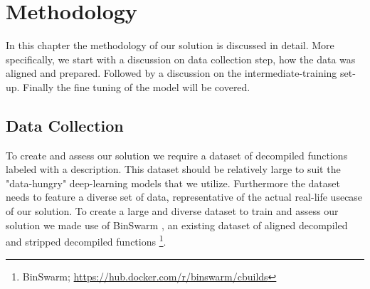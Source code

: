 \chapter{Methodology}
\label{methodology}

In this chapter the methodology of our solution is discussed in detail. More specifically, we start with a discussion on data collection step, how the data was aligned and prepared. Followed by a discussion on the intermediate-training set-up. Finally the fine tuning of the model will be covered.



\section{Data Collection}
To create and assess our solution we require a dataset of decompiled functions labeled with a description. This dataset should be relatively large to suit the "data-hungry" deep-learning models that we utilize. Furthermore the dataset needs to feature a diverse set of data, representative of the actual real-life usecase of our solution. 
To create a large and diverse dataset to train and assess our solution we made use of BinSwarm \cite{InlinedFunc}, an existing dataset of aligned decompiled and stripped decompiled functions \footnote{BinSwarm; \url{https://hub.docker.com/r/binswarm/cbuilds}}.

